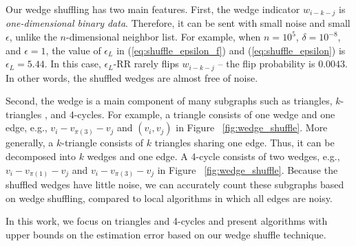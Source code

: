 Our wedge shuffling has two main features. 
First, 
the wedge indicator $w_{i-k-j}$ is \textit{one-dimensional binary data}. 
Therefore, it can be sent with small noise and small $\epsilon$, unlike the $n$-dimensional neighbor list. 
For example, when $n=10^5$, $\delta=10^{-8}$, and $\epsilon=1$, the value of $\epsilon_L$ in (\ref{eq:shuffle_epsilon_f}) and (\ref{eq:shuffle_epsilon}) is $\epsilon_L = 5.44$. 
In this case, $\epsilon_L$-RR rarely flips $w_{i-k-j}$ -- the flip probability is $0.0043$. 
In other words, the shuffled wedges are almost free of noise. 

Second, the wedge is a main component of many subgraphs such as triangles, $k$-triangles \cite{Karwa_PVLDB11}, and 4-cycles. 
For example, a triangle consists of one wedge and one edge, e.g., $v_i-v_{\pi(3)}-v_j$ and $(v_i, v_j)$ in Figure ~\ref{fig:wedge_shuffle}. 
More generally, a $k$-triangle consists of $k$ triangles sharing one edge. 
Thus, it can be decomposed into $k$ wedges and one edge. 
A 4-cycle consists of two wedges, e.g., $v_i-v_{\pi(1)}-v_j$ and $v_i-v_{\pi(3)}-v_j$ in Figure ~\ref{fig:wedge_shuffle}. 
Because the shuffled wedges have little noise, we can accurately count these subgraphs based on wedge shuffling, compared to local algorithms in which all edges are noisy. 

In this work, we focus on triangles and 4-cycles and 
present algorithms with upper bounds on the estimation error based on our wedge shuffle technique. 



